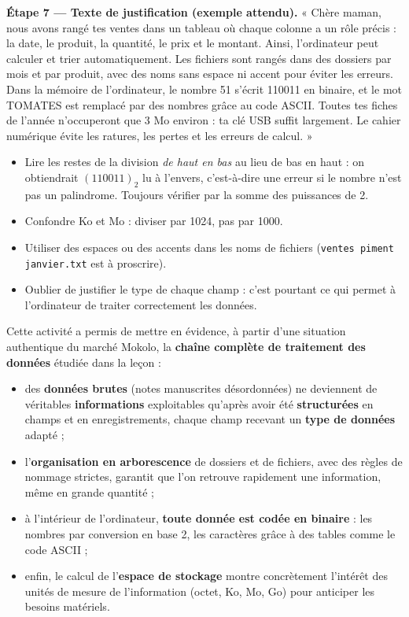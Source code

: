 \documentclass[11pt]{article}
\newcounter{popsec}
\newcounter{popsub}
\newcommand{\courssub}[1]{%
  \stepcounter{popsub}%
  \par\vspace{9pt}\noindent{\popxbold\fontsize{11.5}{13}\selectfont\color{popink}{\color{poporange}\thepopsec.\thepopsub}\hspace{6pt}#1}\par\nopagebreak\vspace{4pt}
}
\begin{document}
\begin{exoresolu}
\textbf{Étape 7 — Texte de justification (exemple attendu).} « Chère maman, nous avons rangé tes ventes dans un tableau où chaque colonne a un rôle précis : la date, le produit, la quantité, le prix et le montant. Ainsi, l'ordinateur peut calculer et trier automatiquement. Les fichiers sont rangés dans des dossiers par mois et par produit, avec des noms sans espace ni accent pour éviter les erreurs. Dans la mémoire de l'ordinateur, le nombre 51 s'écrit 110011 en binaire, et le mot TOMATES est remplacé par des nombres grâce au code ASCII. Toutes tes fiches de l'année n'occuperont que 3 Mo environ : ta clé USB suffit largement. Le cahier numérique évite les ratures, les pertes et les erreurs de calcul. »
\end{exoresolu}

\begin{attention}
\begin{itemize}
\item Lire les restes de la division \emph{de haut en bas} au lieu de bas en haut : on obtiendrait $(110011)_2$ lu à l'envers, c'est-à-dire une erreur si le nombre n'est pas un palindrome. Toujours vérifier par la somme des puissances de 2.
\item Confondre Ko et Mo : diviser par \num{1024}, pas par \num{1000}.
\item Utiliser des espaces ou des accents dans les noms de fichiers (\texttt{ventes piment janvier.txt} est à proscrire).
\item Oublier de justifier le type de chaque champ : c'est pourtant ce qui permet à l'ordinateur de traiter correctement les données.
\end{itemize}
\end{attention}

\courssub{Bilan de l'activité}

Cette activité a permis de mettre en évidence, à partir d'une situation authentique du marché Mokolo, la \textbf{chaîne complète de traitement des données} étudiée dans la leçon :

\begin{itemize}
\item des \textbf{données brutes} (notes manuscrites désordonnées) ne deviennent de véritables \textbf{informations} exploitables qu'après avoir été \textbf{structurées} en champs et en enregistrements, chaque champ recevant un \textbf{type de données} adapté ;
\item l'\textbf{organisation en arborescence} de dossiers et de fichiers, avec des règles de nommage strictes, garantit que l'on retrouve rapidement une information, même en grande quantité ;
\item à l'intérieur de l'ordinateur, \textbf{toute donnée est codée en binaire} : les nombres par conversion en base 2, les caractères grâce à des tables comme le code ASCII ;
\item enfin, le calcul de l'\textbf{espace de stockage} montre concrètement l'intérêt des unités de mesure de l'information (octet, Ko, Mo, Go) pour anticiper les besoins matériels.
\end{itemize}
\end{document}
